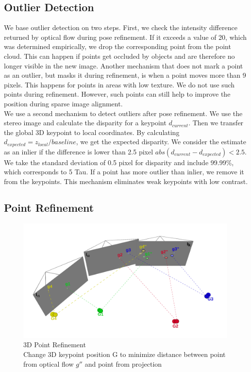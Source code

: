 \documentclass[11pt,a4paper,titlepage,oneside]{report}
\begin{document}
\subsection{Outlier Detection}
We base outlier detection on two steps. First, we check the intensity difference returned by optical flow during pose refinement. If it exceeds a value of 20, which was determined empirically, we drop the corresponding point from the point cloud. This can happen if points get occluded by objects and are therefore no longer visible in the new image. Another mechanism that does not mark a point as an outlier, but masks it during refinement, is when a point moves more than 9 pixels. This happens for points in areas with low texture. We do not use such points during refinement. However, such points can still help to improve the position during sparse image alignment.\\
We use a second mechanism to detect outliers after pose refinement. We use the stereo image and calculate the disparity for a keypoint $d_{current}$. Then we transfer the global 3D keypoint to local coordinates. By calculating $d_{expected}=z_{local}/baseline$, we get the expected disparity. We consider the estimate as an inlier if the difference is lower than 2.5 pixel $abs(d_{current}-d_{expected})<2.5$. We take the standard deviation of 0.5 pixel for disparity and include 99.99\%, which corresponds to 5 Tau. If a point has more outlier than inlier, we remove it from the keypoints. This mechanism eliminates weak keypoints with low contrast.

\subsection{Point Refinement}
\begin{figure}[H]
  \centering
  \includegraphics[width=0.99\textwidth]{img/pose_estimation_point_update.png}
  \caption{3D Point Refinement\\
  Change 3D keypoint position G to minimize distance between point from optical flow $g''$ and point from projection}
  \label{fig:point_update}
\end{figure}
\end{document}
